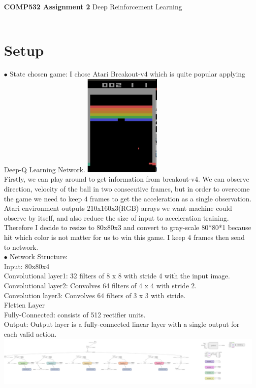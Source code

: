 \documentclass[a4paper, 11pt]{article}
\begin{document}
\noindent
\large\textbf{COMP532 Assignment 2} \hfill 
\normalsize Deep Reinforcement Learning \hfill  
\\\\

\section*{Setup}
$\bullet$ State chosen game: I chose Atari Breakout-v4 which is quite popular applying Deep-Q Learning Network. \includegraphics[height=5cm]{game.png}\\
Firstly, we can play around to get information from breakout-v4. We can observe direction, velocity of the ball in two consecutive frames, but in order to overcome the game we need to keep 4 frames to get the acceleration as a single observation.
Atari environment outputs 210x160x3(RGB) arrays we want machine could observe by itself, and also reduce the size of input to acceleration training. Therefore I decide to resize to 80x80x3 and convert to gray-scale 80*80*1 because hit which color is not matter for us to win this game. I keep 4 frames then send to network.\\
$\bullet$ Network Structure:\\
Input: 80x80x4\\
Convolutional layer1: 32 filters of 8 x 8 with stride 4 with the input image.\\
Convolutional layer2: Convolves 64 filters of 4 x 4 with stride 2.\\
Convolution layer3: Convolves 64 filters of 3 x 3 with stride.\\
Fletten Layer\\
Fully-Connected: consists of 512 rectifier units.\\
Output: Output layer is a fully-connected linear layer with a single output for each valid action.\\
\includegraphics[width = 20cm]{graph.png}
\end{document}
